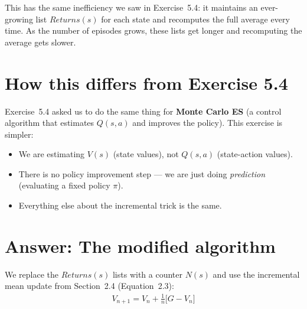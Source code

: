 \documentclass[11pt]{article}
\begin{document}
This has the same inefficiency we saw in Exercise~5.4: it maintains an ever-growing list $Returns(s)$ for each state and recomputes the full average every time. As the number of episodes grows, these lists get longer and recomputing the average gets slower.

\section*{How this differs from Exercise 5.4}

Exercise~5.4 asked us to do the same thing for \textbf{Monte Carlo ES} (a control algorithm that estimates $Q(s, a)$ and improves the policy). This exercise is simpler:

\begin{itemize}[nosep]
    \item We are estimating $V(s)$ (state values), not $Q(s, a)$ (state-action values).
    \item There is no policy improvement step --- we are just doing \textit{prediction} (evaluating a fixed policy $\pi$).
    \item Everything else about the incremental trick is the same.
\end{itemize}

\section*{Answer: The modified algorithm}

We replace the $Returns(s)$ lists with a counter $N(s)$ and use the incremental mean update from Section~2.4 (Equation~2.3):
\begin{align}
    V_{n+1} = V_n + \frac{1}{n}\Big[G - V_n\Big]
\end{align}
\end{document}
